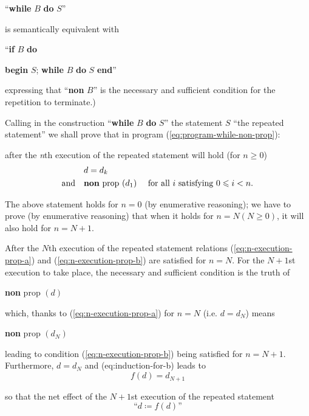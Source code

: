 {
	\setlength{\parindent}{8em}
	``\textbf{while} $B$ \textbf{do} $S$''
}
\medskip

\noindent
is semantically equivalent with
\medskip

{
	\setlength{\parindent}{8em}
	``\textbf{if} $B$ \textbf{do}
	
	\quad \textbf{begin} $S$; \textbf{while} $B$ \textbf{do} $S$ \textbf{end}''
}
\medskip

\noindent
expressing that ``\textbf{non} $B$'' is the necessary and sufficient condition for the repetition to terminate.)

Calling in the construction ``\textbf{while} $B$ \textbf{do} $S$'' the statement $S$ ``the repeated statement'' we shall prove that in program (\ref{eq:program-while-non-prop}):

\quad after the \textit{n}th execution of the repeated statement will hold (for $n \geqslant 0$)
\begin{subequations}
	\label{eq:n-execution-prop}
	\begin{align}
		\label{eq:n-execution-prop-a}
		&d=d_k& \\
		\label{eq:n-execution-prop-b}
		\text{and}\quad &\text{\textbf{non} prop }(d_1) &\text{ for all } i \text{ satisfying } 0 \leqslant i < n.
	\end{align}
\end{subequations}

The above statement holds for $n = 0$ (by enumerative reasoning); we have to prove (by enumerative reasoning) that when it holds for $n = N(N \geqslant 0)$, it will also hold for $n = N + 1$.

After the $N$th execution of the repeated statement relations (\ref{eq:n-execution-prop-a}) and (\ref{eq:n-execution-prop-b}) are satisfied for $n = N$. For the $N + 1$st execution to take place, the necessary and sufficient condition is the truth of
\begin{center}
	\textbf{non} prop $(d)$
\end{center}

\noindent
which, thanks to (\ref{eq:n-execution-prop-a}) for $n = N$ (i.e. $d = d_N$) means
\begin{center}
	\textbf{non} prop $(d_N)$
\end{center}

\noindent 
leading to condition (\ref{eq:n-execution-prop-b}) being satisfied for $n = N + 1$. Furthermore, $d = d_N$ and (eq:induction-for-b) leads to
$$
f(d) = d_{N + 1}
$$

\noindent
so that the net effect of the $N + 1$st execution of the repeated statement
$$
\text{``}d \coloneq f(d)\text{''}
$$

